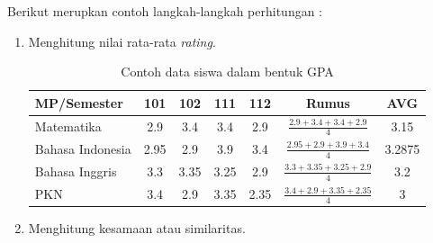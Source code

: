 Berikut merupkan contoh langkah-langkah perhitungan :

\begin{enumerate}
    \item Menghitung nilai rata-rata \textit{rating}.
    
    \begin{table}[H]
    \centering
    \renewcommand{\arraystretch}{1.5}
    \begin{tabular}{|l|c|c|c|c|c|c|}
        \hline
        MP\slash Semester & 101 & 102 & 111 & 112 & Rumus & AVG \\
        \hline 
        Matematika & 2.9 & 3.4 & 3.4 & 2.9 & $\frac{2.9 + 3.4 +3.4 + 2.9}{4}$ & 3.15 \\
        \hline 
        Bahasa Indonesia & 2.95 & 2.9 & 3.9 & 3.4 & $\frac{2.95 + 2.9 + 3.9 + 3.4}{4}$ & 3.2875 \\
        \hline 
        Bahasa Inggris & 3.3 & 3.35 & 3.25 & 2.9 & $\frac{3.3 + 3.35 + 3.25 + 2.9}{4}$ & 3.2 \\
        \hline 
        PKN & 3.4 & 2.9 & 3.35 & 2.35 & $\frac{3.4 + 2.9 + 3.35 + 2.35}{4}$ & 3 \\
        \hline
    \end{tabular}
    \caption{Contoh data siswa dalam bentuk GPA}
	\label{tab:data siswa}
\end{table}

    \item Menghitung kesamaan atau similaritas.
    

\end{enumerate}
